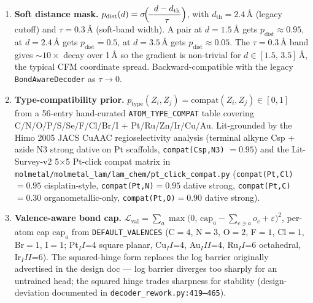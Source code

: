 \begin{enumerate}
  \item \textbf{Soft distance mask.}
        $\displaystyle p_{\text{dist}}(d) =
        \sigma\!\Bigl(\!-\!\frac{d - d_{\text{th}}}{\tau}\Bigr)$,
        with $d_{\text{th}}=2.4$\,\AA{} (legacy cutoff) and
        $\tau=0.3$\,\AA{} (soft-band width). A pair at
        $d\!=\!1.5$\,\AA{} gets $p_{\text{dist}}\!\approx\!0.95$,
        at $d\!=\!2.4$\,\AA{} gets $p_{\text{dist}}\!=\!0.5$, at
        $d\!=\!3.5$\,\AA{} gets $p_{\text{dist}}\!\approx\!0.05$.
        The $\tau\!=\!0.3$\,\AA{} band gives $\sim\!10\times$
        decay over 1\,\AA{} so the gradient is non-trivial for
        $d\!\in\![1.5,\,3.5]$\,\AA{}, the typical CFM coordinate
        spread. Backward-compatible with the legacy
        \texttt{BondAwareDecoder} as $\tau\!\to\!0$.

  \item \textbf{Type-compatibility prior.}
        $\displaystyle p_{\text{type}}(Z_i,Z_j) =
        \text{compat}(Z_i,Z_j)\!\in\![0,1]$ from a 56-entry
        hand-curated \texttt{ATOM\_TYPE\_COMPAT} table covering
        C/N/O/P/S/Se/F/Cl/Br/I + Pt/Ru/Zn/Ir/Cu/Au. Lit-grounded
        by the Himo 2005 JACS CuAAC regioselectivity analysis
        \cite{himo2005cuaac} (terminal alkyne Csp + azide N3
        strong dative on Pt scaffolds, \texttt{compat(Csp,N3)}
        $\!=\!0.95$) and the Lit-Survey-v2
        5$\times$5 Pt-click compat matrix in
        \texttt{molmetal/molmetal\_lam/lam\_chem/pt\_click\_compat.py}
        (\texttt{compat(Pt,Cl)}$\!=\!0.95$ cisplatin-style,
        \texttt{compat(Pt,N)}$\!=\!0.95$ dative strong,
        \texttt{compat(Pt,C)}$\!=\!0.30$ organometallic-only,
        \texttt{compat(Pt,O)}$\!=\!0.90$ dative strong).

  \item \textbf{Valence-aware bond cap.}
        $\displaystyle \mathcal{L}_{\text{val}} =
        \sum_a \max\!\bigl(0,\,
        \text{cap}_a - \!\!\sum_{e\ni a}\!\!o_e + \varepsilon\bigr)^{\!2}$,
        per-atom cap $\text{cap}_a$ from
        \texttt{DEFAULT\_VALENCES} (C$=4$, N$=3$, O$=2$, F$=1$,
        Cl$=1$, Br$=1$, I$=1$; Pt$_II$=4 square planar,
        Cu$_II$=4, Au$_III$=4, Ru$_II$=6 octahedral,
        Ir$_III$=6). The squared-hinge form replaces the log
        barrier originally advertised in the design doc ---
        log barrier diverges too sharply for an untrained head;
        the squared hinge trades sharpness for stability
        (design-deviation documented in
        \texttt{decoder\_rework.py:419--465}).
\end{enumerate}


